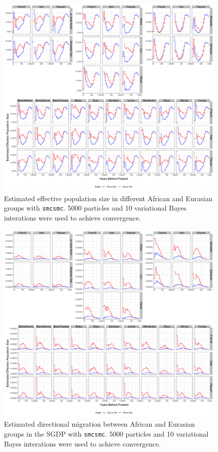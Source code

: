 \documentclass{article}
\begin{document}
\begin{figure}
	\centering
	\label{sgdp_ne}
	\includegraphics[width=\linewidth]{../plot/sgdp_ne.png}
	\caption{Estimated effective population size in different African and Eurasian groups with {\tt smcsmc}. 5000 particles and 10 variational Bayes interations were used to achieve convergence.}	
\end{figure}

\begin{figure}
	\centering
	\label{sgdp_mig}
	\includegraphics[width=\linewidth]{../plot/sgdp_mig.png}
	\caption{Estimated directional migration between African and Eurasian groups in the SGDP with {\tt smcsmc}. 5000 particles and 10 variational Bayes interations were used to achieve convergence.}	
\end{figure}
\end{document}
